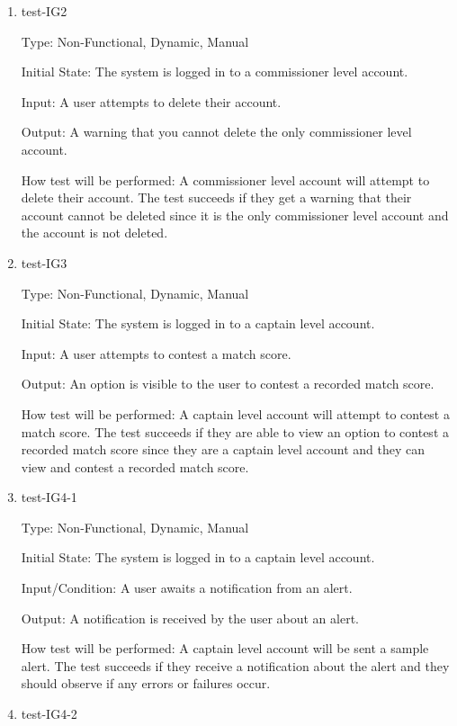 \documentclass[12pt, titlepage]{article}
\begin{document}
\begin{enumerate}
  \item{test-IG2\\}

  Type: Non-Functional, Dynamic, Manual

  Initial State: The system is logged in to a commissioner level account.

  Input: A user attempts to delete their account.

  Output: A warning that you cannot delete the only commissioner level
  account.

  How test will be performed: A commissioner level account will attempt to
  delete their account. The test succeeds if they get a warning that their
  account cannot be deleted since it is the only commissioner level account
  and the account is not deleted.

  \item{test-IG3\\}

  Type: Non-Functional, Dynamic, Manual

  Initial State: The system is logged in to a captain level account.

  Input: A user attempts to contest a match score.

  Output: An option is visible to the user to contest a recorded match score.

  How test will be performed: A captain level account will attempt to
  contest a match score. The test succeeds if they are able to view an option to contest
  a recorded match score since they are a captain level account and they can view and contest
  a recorded match score.

  \item{test-IG4-1\\}

  Type: Non-Functional, Dynamic, Manual

  Initial State: The system is logged in to a captain level account.

  Input/Condition: A user awaits a notification from an alert.

  Output: A notification is received by the user about an alert.

  How test will be performed: A captain level account will be sent a sample alert. The test
  succeeds if they receive a notification about the alert and they should observe if any
  errors or failures occur.

  \item{test-IG4-2\\}


\end{enumerate}
\end{document}
